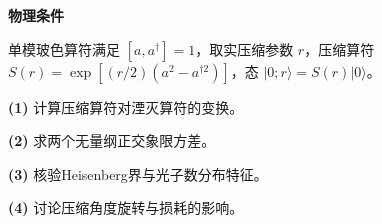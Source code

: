 \textbf{物理条件}\par 单模玻色算符满足 \([a,a^\dagger]=1\)，取实压缩参数 \(r\)，压缩算符 \(S(r)=\exp[(r/2)(a^2-a^{\dagger2})]\)，态 \(|0;r\rangle=S(r)|0\rangle\)。
\par\noindent\textbf{(1)} 计算压缩算符对湮灭算符的变换。
\par\noindent\textbf{(2)} 求两个无量纲正交象限方差。
\par\noindent\textbf{(3)} 核验Heisenberg界与光子数分布特征。
\par\noindent\textbf{(4)} 讨论压缩角度旋转与损耗的影响。
